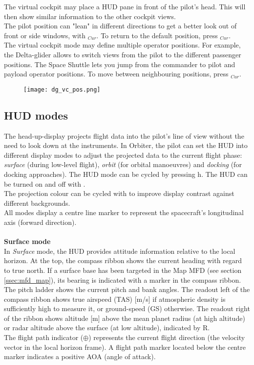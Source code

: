 \documentclass[Orbiter User Manual.tex]{subfiles}
\begin{document}
\noindent
The virtual cockpit may place a HUD pane in front of the pilot's head. This will then show similar information to the other cockpit views.\\
The pilot position can "lean" in different directions to get a better look out of front or side windows, with \Ctrl\Alt\UArrow\RArrow\LArrow$_{Cur}$. To return to the default position, press \Ctrl\Alt\DArrow$_{Cur}$.\\
The virtual cockpit mode may define multiple operator positions. For example, the Delta-glider allows to switch views from the pilot to the different passenger positions. The Space Shuttle lets you jump from the commander to pilot and payload operator positions. To move between neighbouring positions, press \Ctrl\UArrow\DArrow\RArrow\LArrow$_{Cur}$.

\begin{figure}[H]
  \centering
  \texttt{[image: dg\_vc\_pos.png]}
\end{figure}


\subsection{HUD modes}
\label{ssec:hud_modes}
The head-up-display projects flight data into the pilot's line of view without the need to look down at the instruments. In Orbiter, the pilot can set the HUD into different display modes to adjust the projected data to the current flight phase: \textit{surface} (during low-level flight), \textit{orbit} (for orbital manoeuvres) and \textit{docking} (for docking approaches). The HUD mode can be cycled by pressing h. The HUD can be turned on and off with \Ctrl{}.\\
The projection colour can be cycled with \Alt{} to improve display contrast against different backgrounds.\\
All modes display a centre line marker to represent the spacecraft's longitudinal axis (forward direction).\\
\\
\textbf{Surface mode}\\
In \textit{Surface} mode, the HUD provides attitude information relative to the local horizon. At the top, the compass ribbon shows the current heading with regard to true north. If a surface base has been targeted in the Map MFD (see section \ref{ssec:mfd_map}), its bearing is indicated with a marker in the compass ribbon. The pitch ladder shows the current pitch and bank angles. The readout left of the compass ribbon shows true airspeed (TAS) [m/s] if atmospheric density is sufficiently high to measure it, or ground-speed (GS) otherwise. The readout right of the ribbon shows altitude [m] above the mean planet radius (at high altitude) or radar altitude above the surface (at low altitude), indicated by R.\\
The flight path indicator ($\oplus$) represents the current flight direction (the velocity vector in the local horizon frame). A flight path marker located below the centre marker indicates a positive AOA (angle of attack).
\end{document}

